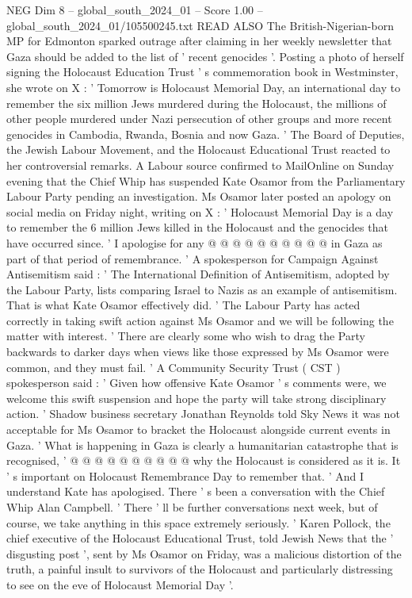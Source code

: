 \begin{textsample}{NEG Dim 8 – global\_south\_2024\_01 – Score 1.00 – global\_south\_2024\_01/105500245.txt}  \label{ex:f8_neg_175}
READ ALSO The British-Nigerian-born MP for Edmonton sparked outrage after claiming in her weekly newsletter that Gaza should be added to the list of ' recent genocides '.
Posting a photo of herself signing the Holocaust Education Trust ' s commemoration book in Westminster, she wrote on X : ' Tomorrow is Holocaust Memorial Day, an international day to remember the six million Jews murdered during the Holocaust, the millions of other people murdered under Nazi persecution of other groups and more recent genocides in Cambodia, Rwanda, Bosnia and now Gaza. ' The Board of Deputies, the Jewish Labour Movement, and the Holocaust Educational Trust reacted to her controversial remarks.
A Labour source confirmed to MailOnline on Sunday evening that the Chief Whip has suspended Kate Osamor from the Parliamentary Labour Party pending an investigation.
Ms Osamor later posted an apology on social media on Friday night, writing on X : ' Holocaust Memorial Day is a day to remember the 6 million Jews killed in the Holocaust and the genocides that have occurred since. ' I apologise for any @ @ @ @ @ @ @ @ @ @ in Gaza as part of that period of remembrance. ' A spokesperson for Campaign Against Antisemitism said : ' The International Definition of Antisemitism, adopted by the Labour Party, lists comparing Israel to Nazis as an example of antisemitism.
That is what Kate Osamor effectively did. ' The Labour Party has acted correctly in taking swift action against Ms Osamor and we will be following the matter with interest. ' There are clearly some who wish to drag the Party backwards to darker days when views like those expressed by Ms Osamor were common, and they must fail. ' A Community Security Trust ( CST ) spokesperson said : ' Given how offensive Kate Osamor ' s comments were, we welcome this swift suspension and hope the party will take strong disciplinary action. ' Shadow business secretary Jonathan Reynolds told Sky News it was not acceptable for Ms Osamor to bracket the Holocaust alongside current events in Gaza. ' What is happening in Gaza is clearly a humanitarian catastrophe that is recognised, ' @ @ @ @ @ @ @ @ @ @ why the Holocaust is considered as it is.
It ' s important on Holocaust Remembrance Day to remember that. ' And I understand Kate has apologised.
There ' s been a conversation with the Chief Whip Alan Campbell. ' There ' ll be further conversations next week, but of course, we take anything in this space extremely seriously. ' Karen Pollock, the chief executive of the Holocaust Educational Trust, told Jewish News that the ' disgusting post ', sent by Ms Osamor on Friday, was a malicious distortion of the truth, a painful insult to survivors of the Holocaust and particularly distressing to see on the eve of Holocaust Memorial Day '.

\end{textsample}
